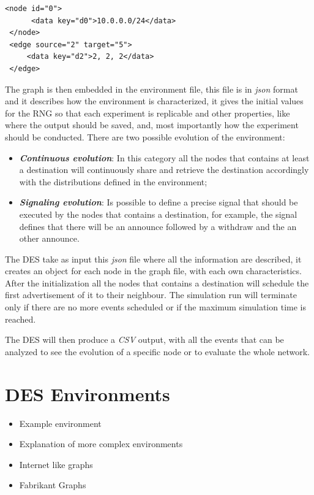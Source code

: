 \begin{lstlisting}[language=graphml, caption=Graph example, label=lst:graph_example]
 <node id="0">
      <data key="d0">10.0.0.0/24</data>
 </node>
 <edge source="2" target="5">                                                  
     <data key="d2">2, 2, 2</data>                                             
 </edge> 
\end{lstlisting}

The graph is then embedded in the environment file, this file is in \textit{json}
format and it describes how the environment is characterized, it gives the
initial values for the \ac{RNG} so that each experiment is replicable and
other properties, like where the output should be saved, and, most importantly
how the experiment should be conducted.
There are two possible evolution of the environment:
\begin{itemize}
    \item \textbf{\textit{Continuous evolution}}: In this category all the nodes
    that contains at least a destination will continuously share and retrieve
    the destination accordingly with the distributions defined in the environment;
    \item \textbf{\textit{Signaling evolution}}: Is possible to define a precise
    signal that should be executed by the nodes that contains a destination, for 
    example, the signal  defines that there will be an announce followed by 
    a withdraw and the an other announce.
\end{itemize}

The \ac{DES} take as input this \textit{json} file where all the information
are described, it creates an object for each node in the graph file, with
each own characteristics.
After the initialization all the nodes that contains a destination will schedule
the first advertisement of it to their neighbour.
The simulation run will terminate only if there are no more events scheduled or
if the maximum simulation time is reached.

The \ac{DES} will then produce a \textit{CSV} output, with all the events that 
can be analyzed to see the evolution of a specific node or to evaluate the
whole network.
 
\section{DES Environments}
\label{sec:des_environment}

\begin{itemize}
    \item Example environment
    \item Explanation of more complex environments
    \item Internet like graphs
    \item Fabrikant Graphs
\end{itemize}

